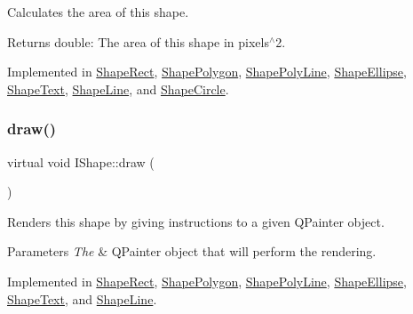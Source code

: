 Calculates the area of this shape. 

\begin{DoxyReturn}{Returns}
double\+: The area of this shape in pixels$^\wedge$2. 
\end{DoxyReturn}


Implemented in \mbox{\hyperlink{class_shape_rect_a87e891eaa6975fc73f4148427076812e}{Shape\+Rect}}, \mbox{\hyperlink{class_shape_polygon_a60c6cad5af503e0c405523a06e9471eb}{Shape\+Polygon}}, \mbox{\hyperlink{class_shape_poly_line_ace9d3c1eefec00364034dc420262c91e}{Shape\+Poly\+Line}}, \mbox{\hyperlink{class_shape_ellipse_a08287b301b7501eb941805eaf85fc00c}{Shape\+Ellipse}}, \mbox{\hyperlink{class_shape_text_ae7af61e4159b53963fa6342024baca70}{Shape\+Text}}, \mbox{\hyperlink{class_shape_line_a6f33bdd78706ad73e570b4ba53bbc00b}{Shape\+Line}}, and \mbox{\hyperlink{class_shape_circle_aebc30fb4ad7165778deb75f0bd2d69bd}{Shape\+Circle}}.

\mbox{\label{class_i_shape_ad97c626e7e2c9afb9f51efc41b836e6f}} 
\subsubsection{\texorpdfstring{draw()}{draw()}}
{\footnotesize\ttfamily virtual void I\+Shape\+::draw (\begin{DoxyParamCaption}\item[{Q\+Painter \&}]{ }\end{DoxyParamCaption})\hspace{0.3cm}{\ttfamily [pure virtual]}}



Renders this shape by giving instructions to a given Q\+Painter object. 


\begin{DoxyParams}{Parameters}
{\em The} & Q\+Painter object that will perform the rendering. \\
\hline
\end{DoxyParams}


Implemented in \mbox{\hyperlink{class_shape_rect_acc35ed70d85acd941b56cc505b9fae6c}{Shape\+Rect}}, \mbox{\hyperlink{class_shape_polygon_a6f4ed4749a739aaf44b5680d75ae8538}{Shape\+Polygon}}, \mbox{\hyperlink{class_shape_poly_line_a6aaca4bd2767644f9ea0f68065fa1f98}{Shape\+Poly\+Line}}, \mbox{\hyperlink{class_shape_ellipse_ac7f0a33cb5a88c6956f2d876c0c5d313}{Shape\+Ellipse}}, \mbox{\hyperlink{class_shape_text_a554bed75c86d0ca7d555eefbc7aff7dc}{Shape\+Text}}, and \mbox{\hyperlink{class_shape_line_a8b4dbfe05387934a0f9c4a053a798239}{Shape\+Line}}.

